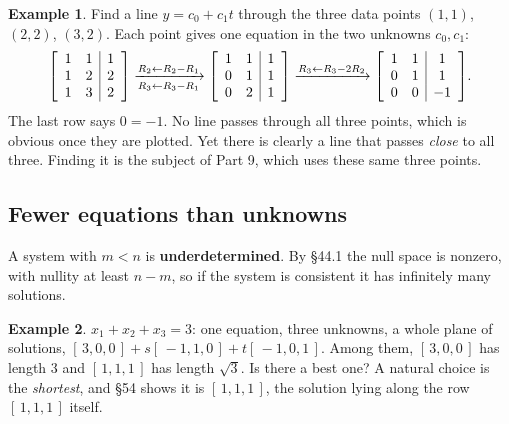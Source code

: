 \documentclass[11pt]{article}
\theoremstyle{plain}
\theoremstyle{definition}
\newtheorem{ex}{Example}[section]
\theoremstyle{remark}
\newenvironment{aug}[1]{\left[\begin{array}{#1}}{\end{array}\right]}
\begin{document}
\begin{ex}
\label{ex:linefit}
Find a line $y=c_0+c_1t$ through the three data points $(1,1)$, $(2,2)$,
$(3,2)$. Each point gives one equation in the two unknowns $c_0,c_1$:
\[
  \begin{aug}{cc|c}1&1&1\\1&2&2\\1&3&2\end{aug}
  \xrightarrow[R_3\gets R_3-R_1]{R_2\gets R_2-R_1}
  \begin{aug}{cc|c}1&1&1\\0&1&1\\0&2&1\end{aug}
  \xrightarrow{R_3\gets R_3-2R_2}
  \begin{aug}{cc|c}1&1&1\\0&1&1\\0&0&-1\end{aug}.
\]
The last row says $0=-1$. No line passes through all three points, which is
obvious once they are plotted. Yet there is clearly a line that passes
\emph{close} to all three. Finding it is the subject of Part 9, which uses these
same three points.
\end{ex}

\subsection{Fewer equations than unknowns}
A system with $m<n$ is \textbf{underdetermined}. By \S44.1 the null space is
nonzero, with nullity at least $n-m$, so if the system is consistent it has
infinitely many solutions.

\begin{ex}
$x_1+x_2+x_3=3$: one equation, three unknowns, a whole plane of solutions,
$[\,3,0,0\,]+s[\,-1,1,0\,]+t[\,-1,0,1\,]$. Among them, $[\,3,0,0\,]$ has length
$3$ and $[\,1,1,1\,]$ has length $\sqrt3$. Is there a best one? A natural choice is
the \emph{shortest}, and \S54 shows it is $[\,1,1,1\,]$, the solution lying
along the row $[\,1,1,1\,]$ itself.
\end{ex}

\end{document}
